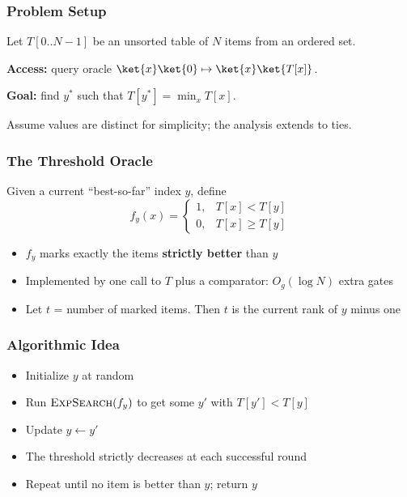 \begin{frame}
  \frametitle{Problem Setup}
  \begin{definition}
    Let $T[0..N-1]$ be an unsorted table of $N$ items from an ordered set.

    \vspace{0.3em}
    \textbf{Access:} query oracle $\ket{x}\ket{0}\mapsto\ket{x}\ket{T[x]}$.

    \vspace{0.3em}
    \textbf{Goal:} find $y^*$ such that $T[y^*] = \min_x T[x]$.
  \end{definition}

  \vspace{0.5cm}
  {\small Assume values are distinct for simplicity; the analysis extends to ties.}
\end{frame}

\begin{frame}
  \frametitle{The Threshold Oracle}
  Given a current ``best-so-far'' index $y$, define
  \[
    f_y(x) =
    \begin{cases}
      1, & T[x] < T[y] \\
      0, & T[x] \ge T[y]
    \end{cases}
  \]

  \vspace{0.3cm}
  \begin{itemize}[<+->]
    \item $f_y$ marks exactly the items \textbf{strictly better} than $y$
    \item Implemented by one call to $T$ plus a comparator: $O_g(\log N)$ extra gates
    \item Let $t$ = number of marked items. Then $t$ is the current rank of $y$ minus one
  \end{itemize}

  \vspace{0.4cm}
\end{frame}

\begin{frame}
  \frametitle{Algorithmic Idea}
  \begin{itemize}[<+->]
    \item Initialize $y$ at random
    \item Run $\textsc{ExpSearch}(f_y)$ to get some $y'$ with $T[y'] < T[y]$
    \item Update $y \leftarrow y'$
    \item The threshold strictly decreases at each successful round
    \item Repeat until no item is better than $y$; return $y$
  \end{itemize}

  \vspace{0.5cm}
\end{frame}

